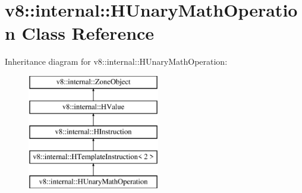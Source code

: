 \hypertarget{classv8_1_1internal_1_1_h_unary_math_operation}{}\section{v8\+:\+:internal\+:\+:H\+Unary\+Math\+Operation Class Reference}
\label{classv8_1_1internal_1_1_h_unary_math_operation}
Inheritance diagram for v8\+:\+:internal\+:\+:H\+Unary\+Math\+Operation\+:\begin{figure}[H]
\begin{center}
\leavevmode
\includegraphics[height=5.000000cm]{classv8_1_1internal_1_1_h_unary_math_operation}
\end{center}
\end{figure}
